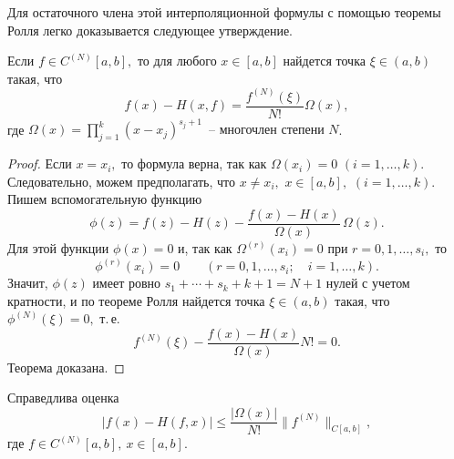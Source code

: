 Для остаточного члена этой интерполяционной формулы с
помощью теоремы Ролля легко доказывается следующее
утверждение.

\begin{teo}
{Если $f\in C^{(N)}[a,b],$ то для} любого $x \in [a,b]$
найдется точка $\xi \in (a,b)$ такая, что
\[
  f(x)-H(x,f)=\frac{f^{(N)}(\xi )}{N!}\Omega (x),
\]
где {$\Omega (x)=\prod\limits_{j=1}^k(x-x_j)^{s_j+1}$~--
многочлен степени $N$}.
\end{teo}

\begin{proof}
Если $x=x_i,$ то {формула} верна, так как $\Omega(x_i)=0$ $(i=1,\dots ,k).$
Следовательно, можем предполагать, что $x \ne x_i,$ $x \in [a,b],$ $(i=1,\dots ,k).$
Пишем вспомогательную функцию
\[
  \phi(z)=f(z)-H(z)-\frac{f(x)-H(x)}{\Omega (x)}\, \Omega (z).
\]
Для этой функции
{$\phi(x)=0$ и, так как $\Omega^{(r)}(x_i)=0$ при $r=0,1,\ldots,s_i,$ то}
\[
\phi^{(r)}(x_i)=0\qquad (r=0,1, \dots ,s_i;\quad i=1, \dots ,k).
\]
Значит, $\phi(z)$ имеет {ровно} $s_1+\cdots +s_k +k+1=N+1$ {нулей с учетом кратности}, и по
теореме Ролля найдется точка $\xi \in (a,b)$ такая, что
$\phi^{(N)}(\xi)=0,$ т.\,е.
\[
  f^{(N)}(\xi )-\frac{f(x)-H(x)}{\Omega (x)} N!=0.
\]
{Теорема доказана.}
\end{proof}

\begin{Corollary}
Справедлива оценка
$$
|f(x)-H(f,x)|\le
\dfrac{|\Omega(x)|}{N!}\|f^{(N)}\|_{C[a,b]},
$$
где $f\in C^{(N)}[a,b],\
x\in [a,b].$
\end{Corollary}
